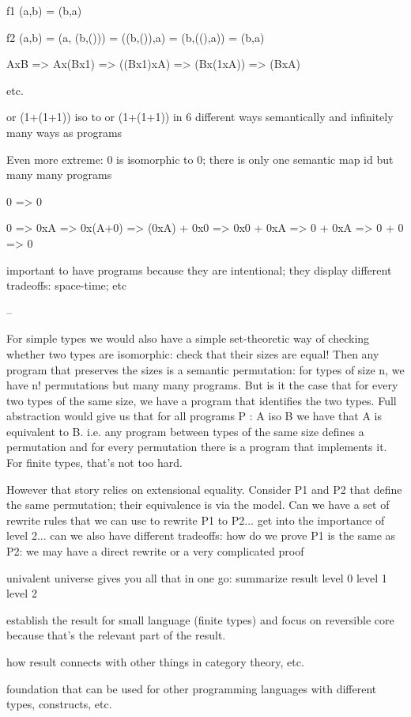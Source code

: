 f1 (a,b) = (b,a)

f2 (a,b) = (a, (b,())) = ((b,()),a) = (b,((),a)) = (b,a)

AxB => Ax(Bx1) => ((Bx1)xA) => (Bx(1xA)) => (BxA)

etc.

or (1+(1+1)) iso to or (1+(1+1)) in 6 different ways semantically and infinitely
many ways as programs

Even more extreme: 0 is isomorphic to 0; there is only one semantic map id but
many many programs

0 => 0

0 => 0xA => 0x(A+0) => (0xA) + 0x0 => 0x0 + 0xA => 0 + 0xA => 0 + 0 => 0

important to have programs because they are intentional; they display different
tradeoffs: space-time; etc

--

For simple types we would also have a simple set-theoretic way of checking
whether two types are isomorphic: check that their sizes are equal! Then any
program that preserves the sizes is a semantic permutation: for types of size n,
we have n! permutations but many many programs. But is it the case that for
every two types of the same size, we have a program that identifies the two
types.  Full abstraction would give us that for all programs P : A iso B we have
that A is equivalent to B. i.e. any program between types of the same size
defines a permutation and for every permutation there is a program that
implements it. For finite types, that's not too hard.


However that story relies on extensional equality. Consider P1 and P2 that
define the same permutation; their equivalence is via the model. Can we have a
set of rewrite rules that we can use to rewrite P1 to P2... get into the
importance of level 2... can we also have different tradeoffs: how do we prove
P1 is the same as P2: we may have a direct rewrite or a very complicated proof


univalent universe gives you all that in one go: summarize result
level 0
level 1
level 2

establish the result for small language (finite types) and focus on reversible
core because that's the relevant part of the result.

how result connects with other things in category theory, etc.

foundation that can be used for other programming languages with different
types, constructs, etc.

